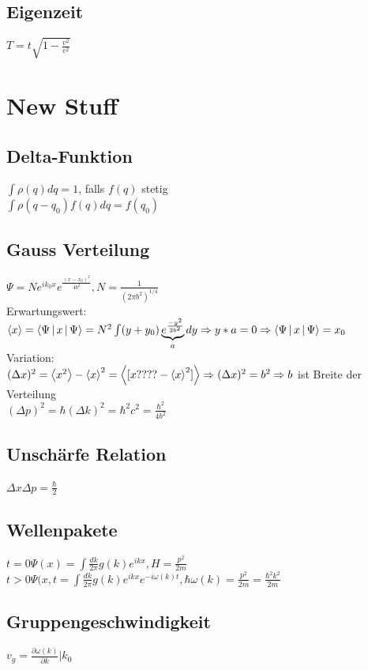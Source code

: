 \documentclass[10pt,a4paper]{article}
\begin{document}
\subsection{Eigenzeit}
$T=t\sqrt{1-\frac{v^2}{c^2}}$
%
\section{New Stuff}
\subsection{Delta-Funktion}
$\int \rho(q)dq=1$, falls $f(q)$ stetig\\
$\int \rho(q-q_0)f(q)dq=f(q_0)$\\
%
\subsection{Gauss Verteilung}
$\Psi = Ne^{ik_0x}e^{\frac{(x-x_0)^2}{4b^2}}, N = \frac{1}{(2\pi b^2)^{1/4}}$\\
Erwartungswert:\\
$\Braket{x}=\Braket{\Psi|x|\Psi} = N^2\int (y+y_0)\underbrace{e^{\frac{-y^2}{2b^2}}}_{a}dy \Rightarrow y*a = 0 \Rightarrow \Braket{\Psi|x|\Psi} = x_0$\\
Variation:\\
$(\Delta x)^2 = \Braket{x^2} - \Braket{x}^2=\Braket{[x????-\Braket{x}^2]}\Rightarrow  (\Delta x)^2 = b^2 \Rightarrow b$ ist Breite der Verteilung\\
$(\Delta p)^2=\hbar(\Delta k)^2 = \hbar^2 c^2=\frac{\hbar^2}{4b^2}$\\
%
\subsection{Unschärfe Relation}
$\Delta x \Delta p= \frac{\hbar}{2}$\\
%
\subsection{Wellenpakete}
$t=0 \Psi(x) = \int \frac{dk}{2\pi}g(k)e^{ikx}, H = \frac{p^2}{2m}$\\
$t>0 \Psi(x,t = \int \frac{dk}{2\pi}g(k)e^{ikx}e^{-i\omega(k)t},\hbar\omega(k) = \frac{p^2}{2m}=\frac{\hbar^2 k^2}{2m}$\\
%
\subsection{Gruppengeschwindigkeit}
$v_g=\frac{\partial\omega(k)}{\partial k}|k_0$
%
\end{document}
